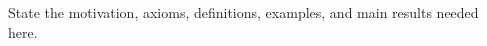 \label{xx:sec:first-section}

State the motivation, axioms, definitions, examples, and main results needed here.
